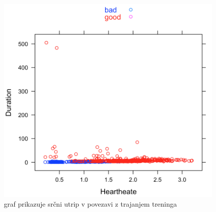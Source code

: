 \documentclass[a4paper,11pt]{article}
\begin{document}
\begin{figure}[H]
\caption{graf prikazuje srčni utrip v povezavi z trajanjem treninga}
\centering
\includegraphics[width=1\textwidth]{athleteClassification}
\end{figure}
\end{document}
